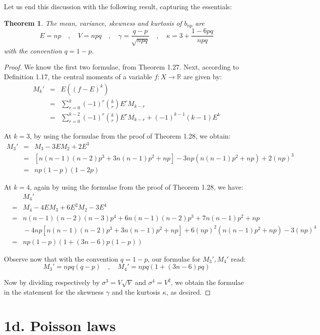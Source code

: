\documentclass[12pt]{amsbook}
\newtheorem{theorem}{Theorem}[chapter]
\begin{document}
Let us end this discussion with the following result, capturing the essentials:


\begin{theorem}
The mean, variance, skewness and kurtosis of $b_{np}$ are
$$E=np\quad,\quad V=npq\quad,\quad\gamma=\frac{q-p}{\sqrt{npq}}\quad,\quad\kappa=3+\frac{1-6pq}{npq}$$
with the convention $q=1-p$.
\end{theorem}

\begin{proof}
We know the first two formulae, from Theorem 1.27. Next, according to Definition 1.17, the central moments of a variable $f:X\to\mathbb R$ are given by:
\begin{eqnarray*}
M_k'
&=&E((f-E)^k)\\
&=&\sum_{r=0}^k(-1)^r\binom{k}{r}E^rM_{k-r}\\
&=&\sum_{r=0}^{k-2}(-1)^r\binom{k}{r}E^rM_{k-r}+(-1)^{k-1}(k-1)E^k
\end{eqnarray*}

At $k=3$, by using the formulae from the proof of Theorem 1.28, we obtain:
\begin{eqnarray*}
M_3'
&=&M_3-3EM_2+2E^3\\
&=&[n(n-1)(n-2)p^3+3n(n-1)p^2+np]-3np(n(n-1)p^2+np)+2(np)^3\\
&=&np(1-p)(1-2p)
\end{eqnarray*}

At $k=4$, again by using the formulae from the proof of Theorem 1.28, we have:
\begin{eqnarray*}
&&M_4'\\
&=&M_4-4EM_3+6E^2M_2-3E^4\\
&=&n(n-1)(n-2)(n-3)p^4+6n(n-1)(n-2)p^3+7n(n-1)p^2+np\\
&&\!\!-4np[n(n-1)(n-2)p^3+3n(n-1)p^2+np]+6(np)^2(n(n-1)p^2+np)-3(np)^4\\
&=&np(1-p)(1+(3n-6)p(1-p))
\end{eqnarray*}

Observe now that with the convention $q=1-p$, our formulae for $M_3',M_4'$ read:
$$M_3'=npq(q-p)\quad,\quad M_4'=npq(1+(3n-6)pq)$$

Now by dividing respectively by $\sigma^3=V\sqrt{V}$ and $\sigma^4=V^2$, we obtain the formulae in the statement for the skewness $\gamma$ and the kurtosis $\kappa$, as desired.
\end{proof}

\section*{1d. Poisson laws}
\end{document}
